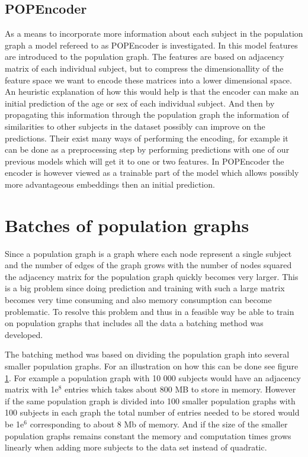 \subsection{POPEncoder}
As a means to incorporate more information about each subject in the population graph a model refereed to as POPEncoder is investigated. In this model features are introduced to the population graph. The features are based on adjacency matrix of each individual subject, but to compress the dimensionallity of the feature space we want to encode these matrices into a lower dimensional space. An heuristic explanation of how this would help is that the encoder can make an initial prediction of the age or sex of each individual subject. And then by propagating this information through the population graph the information of similarities to other subjects in the dataset possibly can improve on the predictions. Their exist many ways of performing the encoding, for example it can be done as a preprocessing step by performing predictions with one of our previous models which will get it to one or two features. In POPEncoder the encoder is however viewed as a trainable part of the model which allows possibly more advantageous embeddings then an initial prediction. 


\section{Batches of population graphs}
Since a population graph is a graph where each node represent a single subject and the number of edges of the graph grows with the number of nodes squared the adjacency matrix for the population graph quickly becomes very larger. This is a big problem since doing prediction and training with such a large matrix becomes very time consuming and also memory consumption can become problematic. To resolve this problem and thus in a feasible way be able to train on population graphs that includes all the data a batching method was developed. 

The batching method was based on dividing the population graph into several smaller population graphs. For an illustration on how this can be done see figure \ref{}. For example a population graph with 10 000 subjects would have an adjacency matrix with 1e$^8$ entries which takes about 800 MB to store in memory. However if the same population graph is divided into 100 smaller population graphs with 100 subjects in each graph the total number of entries needed to be stored would be 1e$^6$ corresponding to about 8 Mb of memory. And if the size of the smaller population graphs remains constant the memory and computation times grows linearly when adding more subjects to the data set instead of quadratic.

